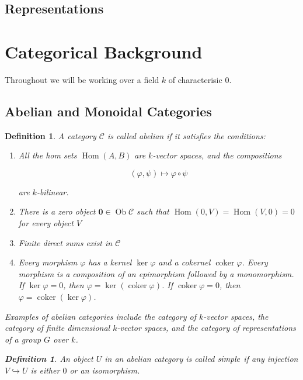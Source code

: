 \documentclass[]{article}
\newtheorem{defn}[theorem]{Definition}
\newcommand{\Hom}{\operatorname{Hom}}
\newcommand{\coker}{\operatorname{coker}}
\newcommand{\Ob}{\operatorname{Ob}}
\numberwithin{equation}{subsection}
\begin{document}
\subsection{Representations}

\section{Categorical Background}
Throughout we will be working over a field $k$ of characterisic 0.
\subsection{Abelian and Monoidal Categories}


\begin{defn}
    A category $\mathcal{C}$ is called \emph{abelian} if it satisfies the conditions:

    \begin{enumerate}
    \renewcommand{\labelenumi}{\roman{enumi})}
        \item All the hom sets $\Hom(A,B)$ are $k$-vector spaces, and the compositions
            
            \begin{equation}
                (\varphi, \psi) \mapsto \varphi \circ \psi
            \end{equation}

            are $k$-bilinear.
        \item There is a zero object $\mathbf{0} \in \Ob \mathcal{C}$ such that $\Hom(0,V) = \Hom(V,0) = 0$ for every object $V$
        \item Finite direct sums exist in $\mathcal{C}$
        \item Every morphism $\varphi$ has a kernel $\ker \varphi$ and a
            cokernel $\coker \varphi$. Every morphism is a composition of an
            epimorphism followed by a monomorphism. If $\ker \varphi = 0$, then
            $\varphi = \ker(\coker \varphi)$. If $\coker \varphi = 0$, then
            $\varphi = \coker(\ker \varphi)$.
    \end{enumerate}

    Examples of abelian categories include the category of $k$-vector spaces,
    the category of finite dimensional $k$-vector spaces, and the category of
    representations of a group $G$ over $k$.

    \begin{defn}
        An object $U$ in an abelian category is called $\emph{simple}$ if any
        injection $V \hookrightarrow U$ is either $0$ or an isomorphism.
    \end{defn}
\end{defn}
\end{document}
